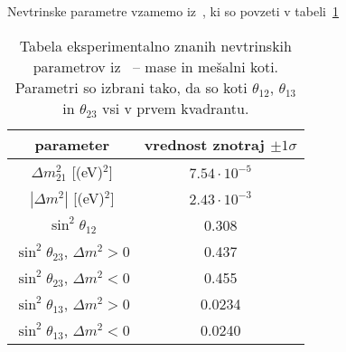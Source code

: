 Nevtrinske parametre vzamemo iz~\cite[str. 49, tabela 14.7]{pdg:neutrinos}, ki so povzeti v
tabeli~\ref{tab:neutrino}
\begin{table}[H]\centering
	\caption{Tabela eksperimentalno znanih nevtrinskih parametrov  iz~\cite{pdg:neutrinos}
		-- mase in mešalni koti. Parametri so izbrani tako, da so koti $\theta_{12}$, 
		$\theta_{13}$ in $\theta_{23}$ vsi v prvem kvadrantu.}
	\begin{tabular}{c|c}
		parameter & vrednost znotraj $\pm 1\sigma$ \\
		\hline \hline
		$\Delta m^2_{21}$ [(eV)$^2$] & $7.54 \cdot 10^{-5}$ \\
		$|\Delta m^2|$ [(eV)$^2$] & $2.43 \cdot 10^{-3}$ \\
		\hline
		$\sin^2 \theta_{12}$ & 0.308 \\
		$\sin^2 \theta_{23}$, $\Delta m^2 > 0$ & 0.437 \\
		$\sin^2 \theta_{23}$, $\Delta m^2 < 0$ & 0.455 \\
		$\sin^2 \theta_{13}$, $\Delta m^2 > 0$ & 0.0234 \\
		$\sin^2 \theta_{13}$, $\Delta m^2 < 0$ & 0.0240
	\end{tabular}
	\label{tab:neutrino}
\end{table}



















